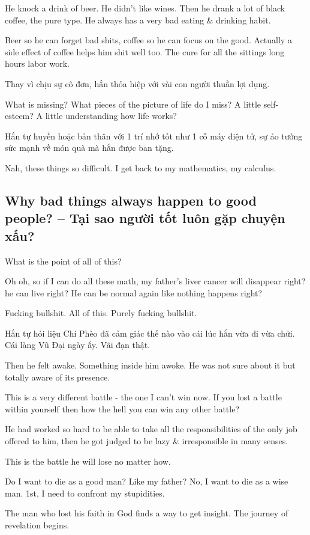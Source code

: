 \documentclass[12pt]{article}
\begin{document}
He knock a drink of beer. He didn't like wines. Then he drank a lot of black coffee, the pure type. He always has a very bad eating \& drinking habit.

Beer so he can forget bad shits, coffee so he can focus on the good. Actually a side effect of coffee helps him shit well too. The cure for all the sittings long hours labor work.

Thay vì chịu sự cô đơn, hắn thỏa hiệp với vài con người thuần lợi dụng. 

What is missing? What pieces of the picture of life do I miss? A little self-esteem? A little understanding how life works?

Hắn tự huyền hoặc bản thân với 1 trí nhớ tốt như 1 cỗ máy điện tử, sự ảo tưởng sức mạnh về món quà mà hắn được ban tặng.

Nah, these things so difficult. I get back to my mathematics, my calculus.

\subsection{Why bad things always happen to good people? -- Tại sao người tốt luôn gặp chuyện xấu?}
What is the point of all of this?

Oh oh, so if I can do all these math, my father's liver cancer will disappear right? he can live right? He can be normal again like nothing happens right?

Fucking bullshit. All of this. Purely fucking bullshit.

Hắn tự hỏi liệu Chí Phèo đã cảm giác thế nào vào cái lúc hắn vừa đi vừa chửi. Cái làng Vũ Đại ngày ấy. Vãi đạn thật.


Then he felt awake. Something inside him awoke. He was not sure about it but totally aware of its presence.

This is a very different battle - the one I can't win now. If you lost a battle within yourself then how the hell you can win any other battle?

He had worked so hard to be able to take all the responsibilities of the only job offered to him, then he got judged to be lazy \& irresponsible in many senses.



This is the battle he will lose no matter how.

Do I want to die as a good man? Like my father? No, I want to die as a wise man. 1st, I need to confront my stupidities.

The man who lost his faith in God finds a way to get insight. The journey of revelation begins.
\end{document}
